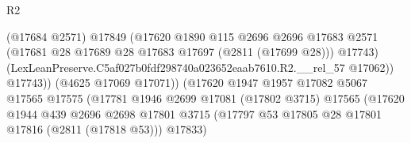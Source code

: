 \begin{lexlean}{R2}
\begin{coremodule}
                                              (@17684 @2571)
                                              @17849
                                              (@17620
                                                @1890
                                                @115
                                                @2696
                                                @2696
                                                @17683
                                                @2571
                                                (@17681
                                                  @28
                                                  @17689
                                                  @28
                                                  @17683
                                                  @17697
                                                  (@2811 (@17699 @28)))
                                                @17743)
                                              (LexLeanPreserve.C5af027b0fdf298740a023652eaab7610.R2.__rel_57
                                                @17062))
                                            @17743))
                                        (@4625 @17069 @17071))
                                      (@17620
                                        @1947
                                        @1957
                                        @17082
                                        @5067
                                        @17565
                                        @17575
                                        (@17781
                                          @1946
                                          @2699
                                          @17081
                                          (@17802 @3715)
                                          @17565
                                          (@17620
                                            @1944
                                            @439
                                            @2696
                                            @2698
                                            @17801
                                            @3715
                                            (@17797
                                              @53
                                              @17805
                                              @28
                                              @17801
                                              @17816
                                              (@2811 (@17818 @53)))
                                            @17833)

\end{coremodule}
\end{lexlean}
